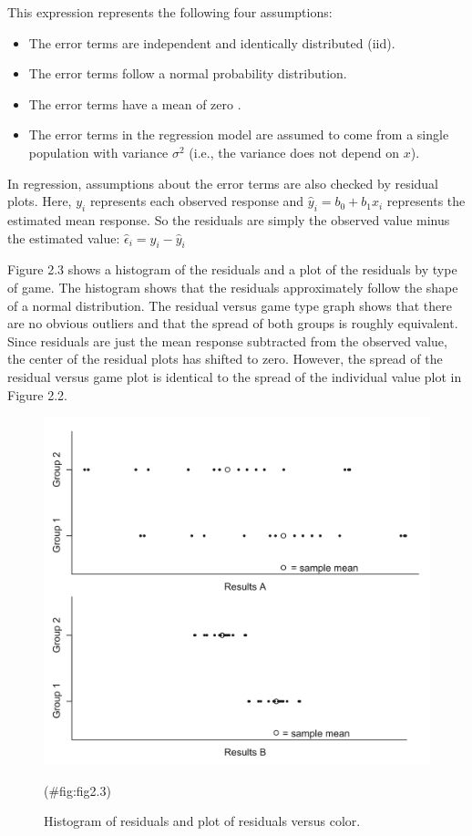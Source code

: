 \documentclass[
]{report}
\providecommand{\tightlist}{%
  \setlength{\itemsep}{0pt}\setlength{\parskip}{0pt}}
\begin{document}
This expression represents the following four assumptions:

\begin{itemize}
\tightlist
\item
  The error terms are independent and identically distributed (iid).
\item
  The error terms follow a normal probability distribution.
\item
  The error terms have a mean of zero .
\item
  The error terms in the regression model are assumed to come from a single population with variance \(\sigma^2\) (i.e., the variance does not depend on \(x\)).
\end{itemize}

In regression, assumptions about the error terms are also checked by residual plots. Here, \(y_i\) represents each observed response and \(\hat{y}_i = b_0 + b_1x_i\) represents the estimated mean response. So the residuals are simply the observed value minus the estimated value: \(\hat{\epsilon}_i = y_i - \hat{y}_i\)

Figure 2.3 shows a histogram of the residuals and a plot of the residuals by type of game. The histogram shows that the residuals approximately follow the shape of a normal distribution. The residual versus game type graph shows that there are no obvious outliers and that the spread of both groups is roughly equivalent. Since residuals are just the mean response subtracted from the observed value, the center of the residual plots has shifted to zero. However, the spread of the residual versus game plot is identical to the spread of the individual value plot in Figure 2.2.

\begin{figure}

{\centering \includegraphics[width=1\linewidth]{docs/Fig2_3} 

}

\caption{Histogram of residuals and plot of residuals versus color.}(\#fig:fig2.3)
\end{figure}
\end{document}
